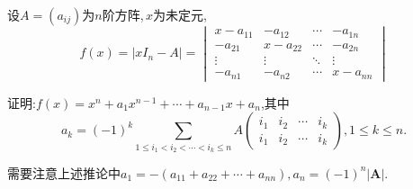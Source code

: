\documentclass[../../main.tex]{subfiles}%
\begin{document}
\begin{corollary}\label{corollary:特征多项式系数与矩阵子式的关系}
设\(A=(a_{ij})\)为\(n\)阶方阵,\(\,x\)为未定元,
\[
f(x)=\vert xI_n - A\vert = 
\begin{vmatrix}
x - a_{11} & -a_{12} & \cdots & -a_{1n} \\
-a_{21} & x - a_{22} & \cdots & -a_{2n} \\
\vdots & \vdots & \ddots & \vdots \\
-a_{n1} & -a_{n2} & \cdots & x - a_{nn}
\end{vmatrix}
\]

证明:\(f(x)=x^n + a_1x^{n - 1}+ \cdots + a_{n - 1}x + a_n\),其中
\[
a_k=(-1)^k \sum_{1\leqslant  i_1 < i_2<\cdots <i_k\leqslant  n} A
\begin{pmatrix}
i_1 & i_2 & \cdots & i_k \\
i_1 & i_2 & \cdots & i_k
\end{pmatrix}, 1\leqslant  k\leqslant  n.
\]
\end{corollary}
\begin{note}
需要注意上述推论中$a_1=-(a_{11}+a_{22}+\cdots+a_{nn}),a_n=\left( -1 \right) ^n\left| \boldsymbol{A} \right|.$
\end{note}
\end{document}
